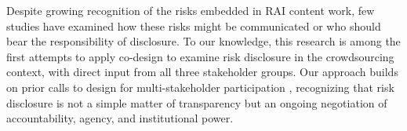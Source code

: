 Despite growing recognition of the risks embedded in RAI content work, few studies have examined how these risks might be communicated or who should bear the responsibility of disclosure. To our knowledge, this research is among the first attempts to apply co-design to examine risk disclosure in the crowdsourcing context, with direct input from all three  stakeholder groups. Our approach builds on prior calls to design for multi-stakeholder participation  \cite{vines2013configuring}, recognizing that risk disclosure is not a simple matter of transparency but an ongoing negotiation of accountability, agency, and institutional power. %





